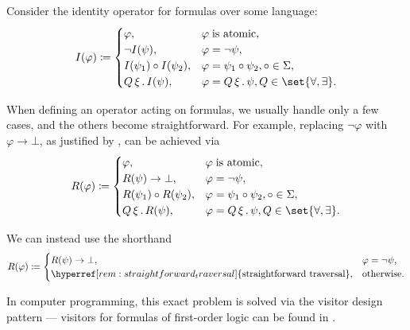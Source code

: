 \begin{remark}\label{rem:straightforward_traversal}
  Consider the identity operator for formulas over some language:
  \begin{equation*}
    \begin{aligned}
      I(\varphi) \coloneqq \begin{cases}
        \varphi,                      &\varphi \T{is atomic}, \\
        \neg I(\psi),                 &\varphi = \neg \psi, \\
        I(\psi_1) \bincirc I(\psi_2), &\varphi = \psi_1 \bincirc \psi_2, \bincirc \in \Sigma, \\
        \quantifier Q \xi I(\psi),    &\varphi = \quantifier Q \xi \psi, Q \in \set{ \forall, \exists }. \\
      \end{cases}
    \end{aligned}
  \end{equation*}

  When defining an operator acting on formulas, we usually handle only a few cases, and the others become straightforward. For example, replacing \( \neg \varphi \) with \( \varphi \rightarrow \bot \), as justified by , can be achieved via
  \begin{equation*}
    \begin{aligned}
      R(\varphi) \coloneqq \begin{cases}
        \varphi,                      &\varphi \T{is atomic}, \\
        R(\psi) \rightarrow \bot,     &\varphi = \neg \psi, \\
        R(\psi_1) \bincirc R(\psi_2), &\varphi = \psi_1 \bincirc \psi_2, \bincirc \in \Sigma, \\
        \quantifier Q \xi R(\psi),    &\varphi = \quantifier Q \xi \psi, Q \in \set{ \forall, \exists }. \\
      \end{cases}
    \end{aligned}
  \end{equation*}

  We can instead use the shorthand
  \begin{equation*}
    \begin{aligned}
      R(\varphi) \coloneqq \begin{cases}
        R(\psi) \rightarrow \bot,                                                &\varphi = \neg \psi, \\
        \hyperref[rem:straightforward_traversal]{\T{straightforward traversal}}, &\T{otherwise.}
      \end{cases}
    \end{aligned}
  \end{equation*}

  In computer programming, this exact problem is solved via the visitor design pattern --- visitors for formulas of first-order logic can be found in \cite{code}.
\end{remark}

